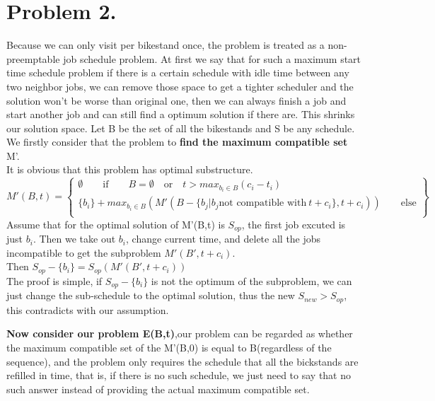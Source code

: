 \documentclass[oneside]{homework} %
\begin{document}
\maketitle
\newpage

\section*{Problem 2.} 
Because we can only visit per bikestand once, the problem is treated as a non-preemptable job schedule problem.
At first we say that for such a maximum start time schedule problem if there is a certain schedule with idle time between any two neighbor jobs, we can remove those space to get a tighter scheduler and the solution won't be worse than original one, then we can always finish a job and start another job and can still find a optimum solution if there are. This shrinks our solution space.
Let B be the set of all the bikestands and S be any schedule.
\\We firstly consider that the problem to \textbf{find the maximum compatible set} M'. 
\\ It is obvious that this problem has optimal substructure.
\begin{equation*}
  M'(B,t) = \left \{
	\begin{array}{l}
	  {\emptyset} \qquad \text{if} \qquad B = \emptyset  \quad \text{or} \quad t > max_{b_{i}\in B}(c_{i}-t_{i}) \\
	  { \{b_{i}\} + max_{b_{i}\in B}(M'(B-\{b_{j}|b_{j} \text{not compatible with}~ t+c_{i} \},t+c_{i}))} \qquad \text{else}  \\
	\end{array}
  \right \}
\end{equation*}
Assume that for the optimal solution of M'(B,t) is $S_{op}$, the first job excuted is just $b_{i}$. Then we take out $b_{i}$, change current time, and delete all the jobs incompatible to get the subproblem $M'(B',t+c_{i})$. \\
Then $S_{op} - \{b_{i}\} = S_{op}(M'(B',t+c_{i}))$
\\ The proof is simple, if $S_{op} - \{b_{i}\}$ is not the optimum of the subproblem, we can just change the sub-schedule to the optimal solution, thus the new $S_{new} > S_{op}$, this contradicts with our assumption.


\textbf{Now consider our problem E(B,t)},our problem can be regarded as whether the maximum compatible set of the M'(B,0) is equal to B(regardless of the sequence), and the problem only requires the schedule that all the bickstands are refilled in time, that is, if there is no such schedule, we just need to say that no such answer instead of providing the actual maximum compatible set. 
\end{document}
